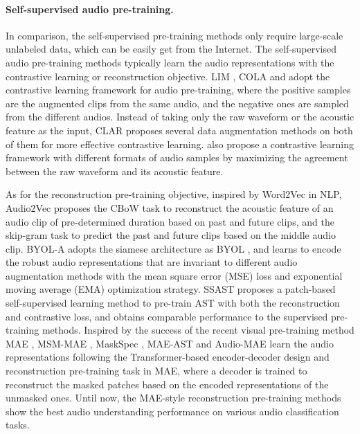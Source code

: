 \documentclass{article}
\theoremstyle{plain}
\theoremstyle{definition}
\theoremstyle{remark}
\begin{document}
\paragraph{Self-supervised audio pre-training.}
In comparison, the self-supervised pre-training methods only require large-scale unlabeled data, which can be easily get from the Internet. 
The self-supervised audio pre-training methods typically learn the audio representations with the contrastive learning or reconstruction objective.
LIM \citep{ravanelli2018learning}, COLA \citep{saeed2021contrastive} and \citet{fonseca2021unsupervised}  adopt the contrastive learning framework for audio pre-training, where the positive samples are the augmented clips from the same audio, and the negative ones are sampled from the different audios. 
Instead of taking only the raw waveform or the acoustic feature as the input, CLAR \citep{al2021clar} proposes several data augmentation methods on both of them for more effective contrastive learning. \citet{wang2021multi} also propose a contrastive learning framework with different formats of audio samples by maximizing the agreement between the
raw waveform and its acoustic feature.

As for the reconstruction pre-training objective, inspired by Word2Vec \citep{Word2Vec} in NLP, Audio2Vec \citep{tagliasacchi2020pre} proposes the CBoW task to reconstruct the acoustic feature of an audio clip of pre-determined duration 
based on past and future clips, and the skip-gram task to predict the past and future clips based on the middle audio clip.
BYOL-A \citep{niizumi2021byol} adopts the siamese architecture as BYOL \citep{grill2020bootstrap}, and learns to encode the robust audio representations that are invariant to different audio augmentation methods with the mean square error (MSE) loss and exponential moving average (EMA) optimization strategy.
SSAST \citep{gong2022ssast} proposes a patch-based self-supervised learning method to pre-train AST \citep{gong2021ast} with both the reconstruction and contrastive loss,
and obtains comparable performance to the supervised pre-training methods.
Inspired by the success of the recent visual pre-training method MAE \citep{he2022masked}, 
MSM-MAE \citep{niizumi2022masked}, MaskSpec \citep{chong2022masked}, MAE-AST \citep{baade2022mae} and Audio-MAE \citep{xu2022masked} learn the audio representations following the Transformer-based encoder-decoder design and reconstruction pre-training task in MAE, where a decoder is trained to reconstruct the masked patches based on the encoded representations of the unmasked ones.
Until now, the MAE-style reconstruction pre-training methods show the best audio understanding performance on various audio classification tasks.
\end{document}
